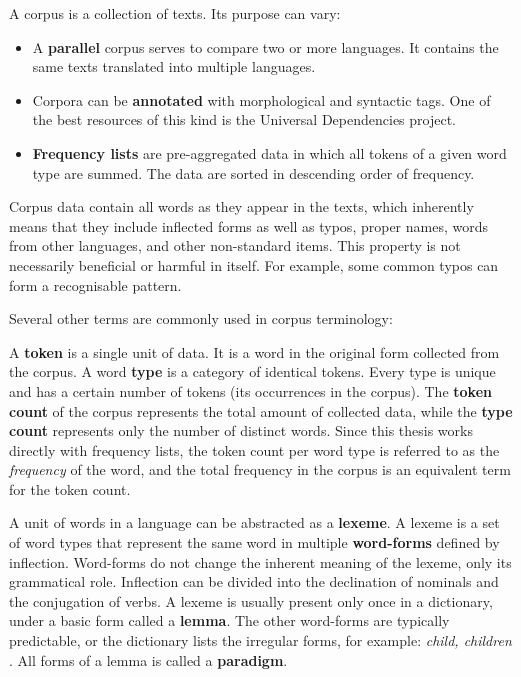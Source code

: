 A corpus is a collection of texts. Its purpose can vary:
\begin{itemize}
    \item A \textbf{parallel} corpus serves to compare two or more languages. It contains the same texts translated into multiple languages.
    \item Corpora can be \textbf{annotated} with morphological and syntactic tags. One of the best resources of this kind is the Universal Dependencies project.
    \item \textbf{Frequency lists} are pre-aggregated data in which all tokens of a given word type are summed. The data are sorted in descending order of frequency.
\end{itemize}

Corpus data contain all words as they appear in the texts, which inherently means that they include inflected forms as well as typos, proper names, words from other languages, and other non-standard items. This property is not necessarily beneficial or harmful in itself. For example, some common typos can form a recognisable pattern.

Several other terms are commonly used in corpus terminology:

A \textbf{token} is a single unit of data. It is a word in the original form collected from the corpus. A word \textbf{type} is a category of identical tokens. Every type is unique and has a certain number of tokens (its occurrences in the corpus). The \textbf{token count} of the corpus represents the total amount of collected data, while the \textbf{type count} represents only the number of distinct words. Since this thesis works directly with frequency lists, the token count per word type is referred to as the \textit{frequency} of the word, and the total frequency in the corpus is an equivalent term for the token count.

A unit of words in a language can be abstracted as a \textbf{lexeme}. A lexeme is a set of word types that represent the same word in multiple \textbf{word-forms} defined by inflection. Word-forms do not change the inherent meaning of the lexeme, only its grammatical role. Inflection can be divided into the declination of nominals and the conjugation of verbs. A lexeme is usually present only once in a dictionary, under a basic form called a \textbf{lemma}. The other word-forms are typically predictable, or the dictionary lists the irregular forms, for example: \textit{child, children} . All forms of a lemma is called a \textbf{paradigm}. \parencite{Panocova2021}


